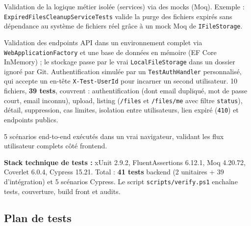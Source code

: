\documentclass[12pt,a4paper]{article}
\begin{document}
\begin{description}[style=nextline]
  \item[Tests unitaires]
    Validation de la logique m\'etier isol\'ee (services) via des mocks (Moq). Exemple : \texttt{ExpiredFilesCleanupServiceTests} valide la purge des fichiers expir\'es sans d\'ependance au syst\`eme de fichiers r\'eel gr\^ace \`a un mock Moq de \texttt{IFileStorage}.

  \item[Tests d'int\'egration]
    Validation des endpoints API dans un environnement complet via \texttt{WebApplicationFactory} et une base de donn\'ees en m\'emoire (EF Core InMemory) ; le stockage passe par le vrai \texttt{LocalFileStorage} dans un dossier ignor\'e par Git. Authentification simul\'ee par un \texttt{TestAuthHandler} personnalis\'e, qui accepte un en-t\^ete \texttt{X-Test-UserId} pour incarner un second utilisateur. 10 fichiers, \textbf{39 tests}, couvrent : authentification (dont email dupliqu\'e, mot de passe court, email inconnu), upload, listing (\texttt{/files} et \texttt{/files/me} avec filtre \texttt{status}), d\'etail, suppression, cas limites, isolation entre utilisateurs, lien expir\'e (\texttt{410}) et endpoints publics.

  \item[Tests E2E (Cypress)]
    5 sc\'enarios end-to-end ex\'ecut\'es dans un vrai navigateur, validant les flux utilisateur complets c\^ot\'e frontend.
\end{description}

\textbf{Stack technique de tests :} xUnit 2.9.2, FluentAssertions 6.12.1, Moq 4.20.72, Coverlet 6.0.4, Cypress 15.21. Total : \textbf{41 tests} backend (2 unitaires + 39 d'int\'egration) et 5 sc\'enarios Cypress. Le script \texttt{scripts/verify.ps1} encha\^ine tests, couverture, build front et audits.

\subsection{Plan de tests}
\end{document}
